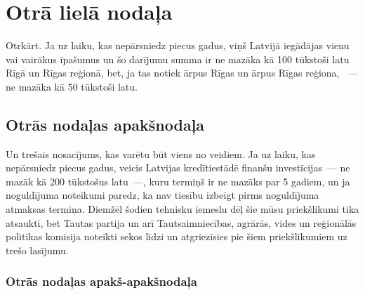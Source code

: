 \documentclass{LU-nosleguma}
\begin{document}
\section{Otrā lielā nodaļa}
Otrkārt. Ja uz laiku, kas nepārsniedz piecus gadus, viņš Latvijā iegādājas vienu vai vairākus īpašumus un šo darījumu
summa ir ne mazāka kā 100 tūkstoši latu Rīgā un Rīgas reģionā, bet, ja tas notiek ārpus Rīgas un ārpus Rīgas reģiona,
~--- ne mazāka kā 50 tūkstoši latu.

\subsection{Otrās nodaļas apakšnodaļa}
Un trešais nosacījums, kas varētu būt viens no veidiem. Ja uz laiku, kas nepārsniedz piecus gadus, veicis Latvijas 
kredītiestādē finanšu investīcijas~--- ne mazāk kā 200 tūkstošus latu~---, kuru termiņš ir ne mazāks par 5 gadiem, 
un ja noguldījuma noteikumi paredz, ka nav tiesību izbeigt pirms noguldījuma atmaksas termiņa.
Diemžēl šodien tehnisku iemeslu dēļ šie mūsu priekšlikumi tika atsaukti, bet Tautas partija un arī Tautsaimniecības, 
agrārās, vides un reģionālās politikas komisija noteikti sekos līdzi un atgriezīsies pie šiem priekšlikumiem uz trešo 
lasījumu.

\subsubsection{Otrās nodaļas apakš-apakšnodaļa}



\end{document}
